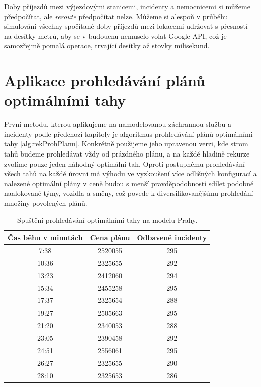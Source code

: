 Doby příjezdů mezi výjezdovými stanicemi, incidenty a nemocnicemi si můžeme předpočítat, ale \textit{reroute} předpočítat nelze.
Můžeme si alespoň v průběhu simulování všechny spočítané doby příjezdů mezi lokacemi udržovat s přesností na desítky metrů,
aby se v budoucnu nemuselo volat Google API, což je samozřejmě pomalá operace, trvající desítky až stovky milisekund. 

\section{Aplikace prohledávání plánů optimálními \linebreak tahy}

První metodu, kterou aplikujeme na namodelovanou záchrannou službu a incidenty podle předchozí kapitoly je algoritmus prohledávání plánů optimálními tahy \ref{alg:rekProhPlanu}.
Konkrétně použijeme jeho upravenou verzi, kde strom tahů budeme prohledávat vždy od prázdného plánu, a na každé hladině rekurze zvolíme pouze jeden náhodný optimální tah.
Oproti postupnému prohledávání všech tahů na každé úrovni má výhodu ve vyzkoušení více odlišných konfigurací a nalezené optimální plány v ceně budou s menší pravděpodobností sdílet
podobně naalokované týmy, vozidla a směny, což povede k diversifikovanějšímu prohledání množiny povolených plánů.

\begin{table}[h!]
\centering
\begin{tabular}{|c|c|c|}
\hline
\textbf{Čas běhu v minutách} & \textbf{Cena plánu} & \textbf{Odbavené incidenty} \\
\hline
7:38  & 2520055 & 295 \\
\hline
10:36 & 2325655 & 292 \\
\hline
13:23 & 2412060 & 294 \\
\hline
15:34 & 2455258 & 295 \\
\hline
17:37 & 2325654 & 288 \\
\hline
19:27 & 2505663 & 295 \\
\hline
21:20 & 2340053 & 288 \\
\hline
23:05 & 2390458 & 292 \\
\hline
24:51 & 2556061 & 295 \\
\hline
26:27 & 2325655 & 290 \\
\hline
28:10 & 2325653 & 286 \\
\hline
\end{tabular}
\caption{Spuštění prohledávání optimálními tahy na modelu Prahy.}
\label{table:optimalMovesTabulka}
\end{table}

